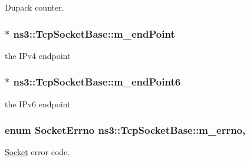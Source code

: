 Dupack counter. 

\subsubsection[{\texorpdfstring{m\+\_\+end\+Point}{m_endPoint}}]{$\ast$ ns3\+::\+Tcp\+Socket\+Base\+::m\+\_\+end\+Point\hspace{0.3cm}{\ttfamily [protected]}}\hypertarget{classns3_1_1TcpSocketBase_a78a4181c0a7394749110ea6b194de467}{}\label{classns3_1_1TcpSocketBase_a78a4181c0a7394749110ea6b194de467}


the I\+Pv4 endpoint 

\subsubsection[{\texorpdfstring{m\+\_\+end\+Point6}{m_endPoint6}}]{$\ast$ ns3\+::\+Tcp\+Socket\+Base\+::m\+\_\+end\+Point6\hspace{0.3cm}{\ttfamily [protected]}}\hypertarget{classns3_1_1TcpSocketBase_ab4b114c3959ee672b4fc9b7a90540dba}{}\label{classns3_1_1TcpSocketBase_ab4b114c3959ee672b4fc9b7a90540dba}


the I\+Pv6 endpoint 

\subsubsection[{\texorpdfstring{m\+\_\+errno}{m_errno}}]{\setlength{\rightskip}{0pt plus 5cm}enum {\bf Socket\+Errno} ns3\+::\+Tcp\+Socket\+Base\+::m\+\_\+errno\hspace{0.3cm}{\ttfamily [mutable]}, {\ttfamily [protected]}}\hypertarget{classns3_1_1TcpSocketBase_a592901b6c992843533af1b7c1c7f9474}{}\label{classns3_1_1TcpSocketBase_a592901b6c992843533af1b7c1c7f9474}


\hyperlink{classns3_1_1Socket}{Socket} error code. 

